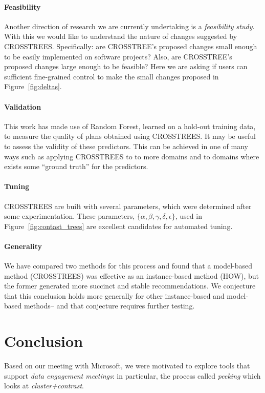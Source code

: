 \documentclass[conference]{IEEEtran}
\newcommand{\fig}[1]{Figure~\ref{fig:#1}}
\begin{document}
\paragraph{Feasibility} Another direction of research we are currently undertaking is a \textit{feasibility study}. With this we would like to understand the nature of changes suggested by CROSSTREES. Specifically: are CROSSTREE's proposed changes  small enough to be easily implemented on software projects?
	Also, are CROSSTREE's proposed changes large enough to be feasible? Here we are asking if users can sufficient fine-grained control to make the small changes proposed in \fig{deltas}.
	  

\paragraph{Validation} This work has made use of Random Forest, learned on a hold-out training data, to measure the quality of plans obtained using CROSSTREES. It may be useful to assess the validity of these predictors. This can be achieved in one of many ways such as applying CROSSTREES to to more domains and to domains where exists some ``ground truth'' for the predictors.

\paragraph{Tuning} CROSSTREES are built with several parameters, which were determined after some experimentation. These parameters, $\{\alpha, \beta, \gamma, \delta, \epsilon\}$, used in \fig{contast_trees} are excellent candidates for automated tuning. 

\paragraph{Generality} We have compared two methods for this process and found that a model-based method (CROSSTREES) was effective as an instance-based method (HOW), but the former generated more succinct and stable recommendations. We conjecture that this conclusion holds more generally for other instance-based and model-based methods-- and that conjecture requires further testing.

\section{Conclusion}
Based on our meeting with Microsoft, we were motivated to explore tools that support {\em data engagement meetings}: in particular, the process called {\em peeking} which looks at \textit{cluster+contrast}. 
\end{document}
